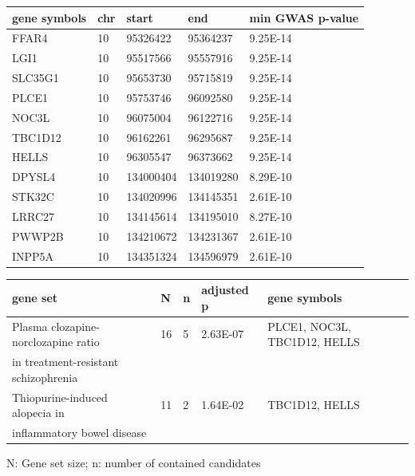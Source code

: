 \begin{refsection}
\begin{table}[H]
\small
{}\selectfont
{} \label{table3S5} 
\centering
\begin{tabular}{@{}lllll@{}}
\hline
gene symbols & chr & start     & end       & min GWAS p-value \\ \hline
FFAR4        & 10  & 95326422  & 95364237  & 9.25E-14         \\
LGI1         & 10  & 95517566  & 95557916  & 9.25E-14         \\
SLC35G1      & 10  & 95653730  & 95715819  & 9.25E-14         \\
PLCE1        & 10  & 95753746  & 96092580  & 9.25E-14         \\
NOC3L        & 10  & 96075004  & 96122716  & 9.25E-14         \\
TBC1D12      & 10  & 96162261  & 96295687  & 9.25E-14         \\
HELLS        & 10  & 96305547  & 96373662  & 9.25E-14         \\
DPYSL4       & 10  & 134000404 & 134019280 & 8.29E-10         \\
STK32C       & 10  & 134020996 & 134145351 & 2.61E-10         \\
LRRC27       & 10  & 134145614 & 134195010 & 8.27E-10         \\
PWWP2B       & 10  & 134210672 & 134231367 & 2.61E-10         \\
INPP5A       & 10  & 134351324 & 134596979 & 2.61E-10         \\ \hline
\end{tabular}
\end{table}


\begin{table}[H]
\small
{}\selectfont
{} \label{table3S6} 
\centering
\begin{tabular}{@{}lllll@{}}
\hline
gene set                              & N  & n & adjusted p & gene symbols                 \\ \hline
Plasma clozapine-norclozapine ratio   & 16 & 5 & 2.63E-07   & PLCE1, NOC3L, TBC1D12, HELLS \\
in treatment-resistant schizophrenia &    &   &            &                              \\
Thiopurine-induced alopecia in        & 11 & 2 & 1.64E-02   & TBC1D12, HELLS               \\
inflammatory bowel disease            &    &   &            &                              \\ \hline
\end{tabular}
{\begin{flushleft}
\scriptsize N: Gene set size; n: number of contained candidates
\end{flushleft}}
\end{table}



\end{refsection}
